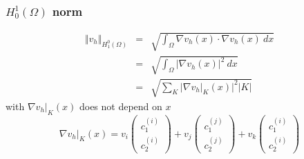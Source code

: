 \documentclass[a4paper,10pt]{article}
\begin{document}
\subsubsection{$ H_{0}^{1}(\Omega) $ norm}
\begin{eqnarray} \nonumber
\Vert v_{h} \Vert_{H_1^0(\Omega)} &=& \sqrt{\int_{\Omega} \nabla v_{h}(x) \cdot \nabla v_{h}(x) \ dx} \\ \nonumber
&=& \sqrt{\int_{\Omega} \vert \nabla v_{h}(x) \vert^{2} \ dx} \\ \nonumber
&=& \sqrt{\sum_{K} \vert \nabla v_{h}|_{K} (x) \vert^{2} \vert K \vert}
\end{eqnarray}
with $ \nabla v_{h}|_{K}(x) $ does not depend on $ x $
\[ \nabla v_{h}|_{K}(x) = v_{i} \begin{pmatrix} c_{1}^{(i)}\\ c_{2}^{(i)} \end{pmatrix} + v_{j} \begin{pmatrix} c_{1}^{(j)}\\ c_{2}^{(j)} \end{pmatrix} + v_{k} \begin{pmatrix} c_{1}^{(i)}\\ c_{2}^{(i)} \end{pmatrix}\] 
\end{document}
